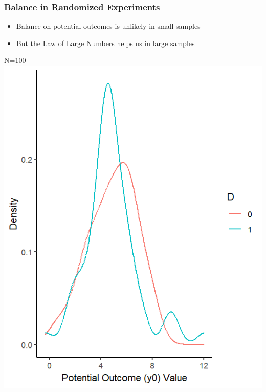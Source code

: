 \documentclass[xcolor=x11names,compress]{beamer}\usepackage[]{graphicx}\usepackage[]{color}
\makeatletter
\def\maxwidth{ %
  \ifdim\Gin@nat@width>\linewidth
    \linewidth
  \else
    \Gin@nat@width
  \fi
}
\newenvironment{knitrout}{}{} %
\renewcommand{\(}{\begin{columns}}
\renewcommand{\)}{\end{columns}}
\newcommand{\<}[1]{\begin{column}{#1}}
\renewcommand{\>}{\end{column}}
\makeatother
\begin{document}
\begin{frame}
\frametitle{Balance in Randomized Experiments}
\begin{multicols}{2}
\begin{itemize}
\item Balance on potential outcomes is unlikely in small samples
\item But the Law of Large Numbers helps us in large samples
\end{itemize}
\columnbreak
N=100
\begin{knitrout}
\color{fgcolor}
\includegraphics[width=\maxwidth]{figure/balance_N5-1} 

\end{knitrout}
\end{multicols}
\end{frame}
\end{document}
